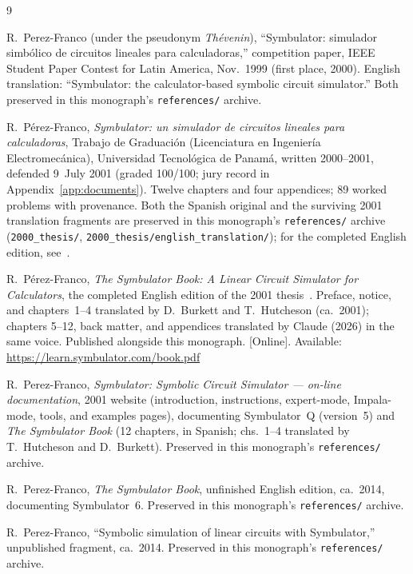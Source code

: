 \documentclass[11pt,oneside]{report}
\newcommand{\code}[1]{\texttt{#1}}
\begin{document}
\begin{thebibliography}{9}

R.~Perez-Franco (under the pseudonym \emph{Th\'evenin}),
``Symbulator: simulador simb\'olico de circuitos lineales para
calculadoras,'' competition paper, IEEE Student Paper Contest for
Latin America, Nov.\ 1999 (first place, 2000). English translation:
``Symbulator: the calculator-based symbolic circuit simulator.''
Both preserved in this monograph's \code{references/} archive.

R.~P\'erez-Franco, \emph{Symbulator: un simulador de circuitos
lineales para calculadoras}, Trabajo de Graduaci\'on (Licenciatura en
Ingenier\'ia Electromec\'anica), Universidad Tecnol\'ogica de
Panam\'a, written 2000--2001, defended 9~July 2001 (graded 100/100;
jury record in Appendix~\ref{app:documents}). Twelve chapters and
four appendices; 89 worked problems with provenance. Both the
Spanish original and the surviving 2001 translation fragments are
preserved in this monograph's \code{references/} archive
(\code{2000\_thesis/}, \code{2000\_thesis/english\_translation/});
for the completed English edition, see~\cite{book2026}.

R.~P\'erez-Franco, \emph{The Symbulator Book: A Linear Circuit
Simulator for Calculators}, the completed English edition of the
2001 thesis~\cite{thesis2000}. Preface, notice, and chapters~1--4
translated by D.~Burkett and T.~Hutcheson (ca.~2001); chapters
5--12, back matter, and appendices translated by Claude (2026) in
the same voice. Published alongside this monograph. [Online].
Available: \url{https://learn.symbulator.com/book.pdf}

R.~Perez-Franco, \emph{Symbulator: Symbolic Circuit Simulator ---
on-line documentation}, 2001 website (introduction, instructions,
expert-mode, Impala-mode, tools, and examples pages), documenting
Symbulator~Q (version~5) and \emph{The Symbulator Book} (12 chapters,
in Spanish; chs.\ 1--4 translated by T.~Hutcheson and D.~Burkett).
Preserved in this monograph's \code{references/} archive.

R.~Perez-Franco, \emph{The Symbulator Book}, unfinished English
edition, ca.\ 2014, documenting Symbulator~6. Preserved in this
monograph's \code{references/} archive.

R.~Perez-Franco, ``Symbolic simulation of linear circuits with
Symbulator,'' unpublished fragment, ca.\ 2014. Preserved in this
monograph's \code{references/} archive.


\end{thebibliography}
\end{document}
